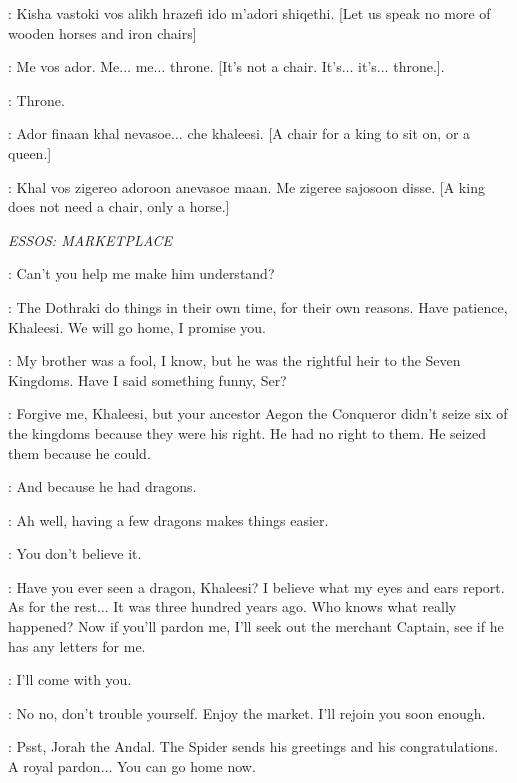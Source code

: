\DROGO: Kisha vastoki vos alikh hrazefi ido m'adori shiqethi. [Let us speak no more of wooden horses and iron chairs] 

\DAENERYS: Me vos ador. Me$\ldots$ me$\ldots$ throne. [It's not a chair. It's$\ldots$ it's$\ldots$ throne.]. 

\DROGO: Throne. 

\DAENERYS: Ador finaan khal nevasoe$\ldots$ che khaleesi. [A chair for a king to sit on, or a queen.] 

\DROGO: Khal vos zigereo adoroon anevasoe maan. Me zigeree sajosoon disse. [A king does not need a chair, only a horse.] 


\scene

\textit{ESSOS: MARKETPLACE} 


\DAENERYS: Can't you help me make him understand? 

\JORAH: The Dothraki do things in their own time, for their own reasons. Have patience, Khaleesi. We will go home, I promise you. 

\DAENERYS: My brother was a fool, I know, but he was the rightful heir to the Seven Kingdoms. Have I said something funny, Ser? 

\JORAH: Forgive me, Khaleesi, but your ancestor Aegon the Conqueror didn't seize six of the kingdoms because they were his right. He had no right to them. He seized them because he could. 

\DAENERYS: And because he had dragons. 

\JORAH: Ah well, having a few dragons makes things easier. 

\DAENERYS: You don't believe it. 

\JORAH: Have you ever seen a dragon, Khaleesi? I believe what my eyes and ears report. As for the rest$\ldots$ It was three hundred years ago. Who knows what really happened? Now if you'll pardon me, I'll seek out the merchant Captain, see if he has any letters for me. 

\DAENERYS: I'll come with you. 

\JORAH: No no, don't trouble yourself. Enjoy the market. I'll rejoin you soon enough. 


\BOY: Psst, Jorah the Andal. The Spider sends his greetings and his
congratulations.  A royal pardon$\ldots$ You
can go home now.

